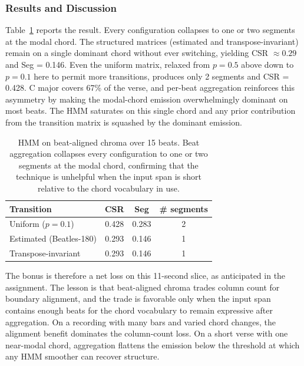 \documentclass{article}
\begin{document}
\subsubsection{Results and Discussion}
Table~\ref{tab:bonus} reports the result. Every configuration collapses to one or two segments at the modal chord. The structured matrices (estimated and transpose-invariant) remain on a single dominant chord without ever switching, yielding CSR $\approx 0.29$ and Seg = 0.146. Even the uniform matrix, relaxed from $p = 0.5$ above down to $p = 0.1$ here to permit more transitions, produces only 2 segments and CSR = 0.428. C major covers 67\% of the verse, and per-beat aggregation reinforces this asymmetry by making the modal-chord emission overwhelmingly dominant on most beats. The HMM saturates on this single chord and any prior contribution from the transition matrix is squashed by the dominant emission.

\begin{table}[ht]
    \centering
    \caption{HMM on beat-aligned chroma over 15 beats. Beat aggregation collapses every configuration to one or two segments at the modal chord, confirming that the technique is unhelpful when the input span is short relative to the chord vocabulary in use.}
    \label{tab:bonus}
    \begin{tabular}{lccc}
        \toprule
        Transition             & CSR   & Seg   & \# segments \\
        \midrule
        Uniform ($p = 0.1$)    & 0.428 & 0.283 & 2           \\
        Estimated (Beatles-180) & 0.293 & 0.146 & 1           \\
        Transpose-invariant    & 0.293 & 0.146 & 1           \\
        \bottomrule
    \end{tabular}
\end{table}

The bonus is therefore a net loss on this 11-second slice, as anticipated in the assignment. The lesson is that beat-aligned chroma trades column count for boundary alignment, and the trade is favorable only when the input span contains enough beats for the chord vocabulary to remain expressive after aggregation. On a recording with many bars and varied chord changes, the alignment benefit dominates the column-count loss. On a short verse with one near-modal chord, aggregation flattens the emission below the threshold at which any HMM smoother can recover structure.
\end{document}
